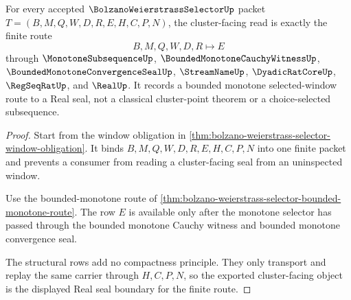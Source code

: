 \begin{theorem}
\label{thm:bolzano-weierstrass-selector-cluster-route}
For every accepted $\BolzanoWeierstrassSelectorUp$ packet $T=(B,M,Q,W,D,R,E,H,C,P,N)$, the cluster-facing read is exactly the finite route
$$
B,M,Q,W,D,R \longmapsto E
$$
through $\MonotoneSubsequenceUp$, $\BoundedMonotoneCauchyWitnessUp$, $\BoundedMonotoneConvergenceSealUp$, $\StreamNameUp$, $\DyadicRatCoreUp$, $\RegSeqRatUp$, and $\RealUp$. It records a bounded monotone selected-window route to a Real seal, not a classical cluster-point theorem or a choice-selected subsequence.
\end{theorem}
\begin{proof}
Start from the window obligation in \autoref{thm:bolzano-weierstrass-selector-window-obligation}. It binds $B,M,Q,W,D,R,E,H,C,P,N$ into one finite packet and prevents a consumer from reading a cluster-facing seal from an uninspected window.

Use the bounded-monotone route of \autoref{thm:bolzano-weierstrass-selector-bounded-monotone-route}. The row $E$ is available only after the monotone selector has passed through the bounded monotone Cauchy witness and bounded monotone convergence seal.

The structural rows add no compactness principle. They only transport and replay the same carrier through $H,C,P,N$, so the exported cluster-facing object is the displayed Real seal boundary for the finite route.
\end{proof}

